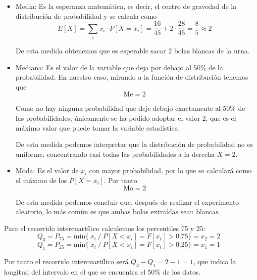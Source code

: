 \subproblem
\begin{itemize}
\item Media: Es la esperanza matemática, es decir, el centro de gravedad de la distribución de probabilidad y se calcula como $$E[X] = \sum_i x_i \cdot P[X = x_i] = \dfrac{16}{45} + 2\cdot \dfrac{28}{45} = \dfrac{8}{5} \approx 2$$

De esta medida obtenemos que es esperable sacar 2 bolas blancas de la urna. 

\item Mediana: Es el valor de la variable que deja por debajo al 50\% de la probabilidad. En nuestro caso, mirando a la función de distribución tenemos que $$ \mbox{Me} = 2 $$

Como no hay ninguna probabilidad que deje debajo exactamente al 50\% de las probabilidades, únicamente se ha podido adoptar el valor 2, que es el máximo valor que puede tomar la variable estadística. 

De esta medida podemos interpretar que la distribución de probabilidad no es uniforme, concentrando casi todas las probabilidades a la derecha $X=2$. 

\item Moda: Es el valor de $x_i$ con mayor probabilidad, por lo que se calculará como el máximo de los $P[X = x_i]$. Por tanto $$ \mbox{Mo} = 2$$

De esta medida podemos concluir que, después de realizar el experimento aleatorio, lo más común es que ambas bolas extraídas sean blancas. 
\end{itemize}

\subproblem
Para el recorrido intercuartílico calculemos los percentiles 75 y 25: \\

$$ Q_3 = P_{75} = \mbox{min}\{\ x_i\ /\ P[X < x_i] = F[x_i] > 0.75\} = x_2 = 2 $$
$$ Q_1 = P_{25} = \mbox{min}\{\ x_i\ /\ P[X < x_i] = F[x_i] > 0.25\} = x_1 = 1 $$

Por tanto el recorrido intercuartílico será $Q_3 - Q_1 = 2-1 = 1$, que indica la longitud del intervalo en el que se encuentra el 50\% de los datos.

